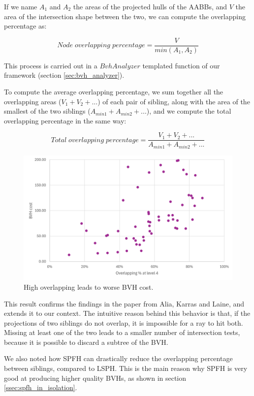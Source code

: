 \documentclass{PoliMi_MasterThesis}
\begin{document}
If we name $A_1$ and $A_2$ the areas of the projected hulls of the AABBs, and $V$ the area of the intersection shape between the two, we can compute the overlapping percentage as:

$$Node \; overlapping \; percentage = \frac{V}{min(A_1, A_2)}$$

This process is carried out in a $BvhAnalyzer$ templated function of our framework (section \ref{sec:bvh_analyzer}).

To compute the average overlapping percentage, we sum together all the overlapping areas ($V_1 + V_2 + ...$) of each pair of sibling, along with the area of the smallest of the two siblings ($A_{min1} + A_{min2} + ...$), and we compute the total overlapping percentage in the same way:

$$Total \; overlapping \; percentage = \frac{V_1 + V_2 + ...}{A_{min1} + A_{min2} + ...}$$

\begin{figure}[H] 
	\centering
	\includegraphics[width=\textwidth]{Images/overlapping_quality_scatter.png}
	\caption{High overlapping leads to worse BVH cost.}
	\label{fig:pah_overlapping_children}
\end{figure}

This result confirms the findings in the paper from Alia, Karras and Laine, and extends it to our context. The intuitive reason behind this behavior is that, if the projections of two siblings do not overlap, it is impossible for a ray to hit both. Missing at least one of the two leads to a smaller number of intersection tests, because it is possible to discard a subtree of the BVH.

We also noted how SPFH can drastically reduce the overlapping percentage between siblings, compared to LSPH. This is the main reason why SPFH is very good at producing higher quality BVHs, as shown in section \ref{ssec:spfh_in_isolation}.
\end{document}
